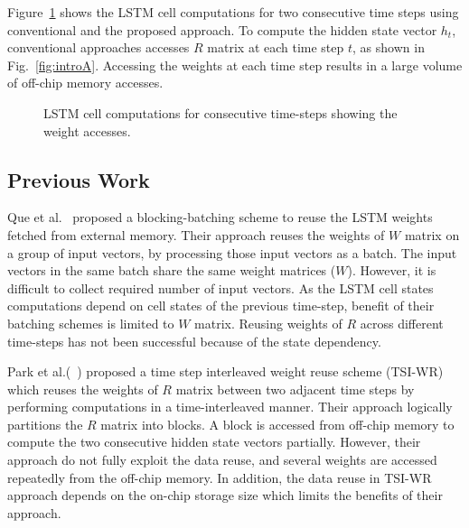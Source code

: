 \documentclass[a4paper,10pt]{article}
\begin{document}
Figure{~\ref{fig:introToApproach}} shows the LSTM cell computations for two consecutive time steps using  conventional and the proposed approach. To compute the hidden state vector $h_t$, conventional approaches accesses $R$ matrix at each time step $t$, as shown in Fig.{~\ref{fig:introA}}. Accessing the weights at each time step results in a large volume of off-chip memory accesses. 
\begin{figure}[!htb]
	\centering
	\hfil
	\hfil	
	\caption{LSTM cell computations for consecutive time-steps showing the weight accesses.}
	\label{fig:introToApproach}
	\vspace{-1.0em}	
\end{figure}
\subsection{Previous Work}
Que et al.~\cite{que2019efficient} proposed a blocking-batching scheme to reuse the LSTM weights fetched from external memory. Their approach reuses the weights of $W$ matrix on a group of input vectors, by processing those input vectors as a batch. The input vectors in the same batch share the same weight matrices ($W$). However, it is difficult to collect required number of input vectors. As the LSTM cell states computations depend on cell states of the previous time-step, benefit of their batching schemes is limited to $W$ matrix. Reusing weights of $R$ across different time-steps has not been successful because of the state dependency.

Park et al.(~\cite{park2020time}) proposed a time step interleaved weight reuse scheme (TSI-WR) which reuses the weights of $R$ matrix between two adjacent time steps by performing computations in a time-interleaved manner. Their approach logically partitions the $R$ matrix into blocks. A block is accessed from off-chip memory to compute the two consecutive hidden state vectors partially. However, their approach do not fully exploit the data reuse, and several weights are accessed repeatedly from the off-chip memory. In addition, the data reuse in TSI-WR approach depends on the on-chip storage size which limits the benefits of their approach.
\end{document}
